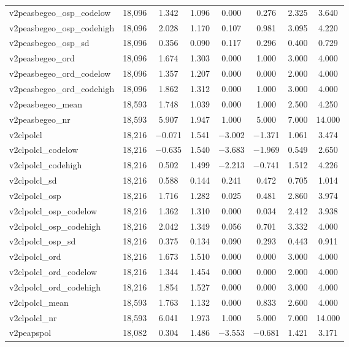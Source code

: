 \begin{table}[!htbp]
\begin{tabular}{@{\extracolsep{5pt}}lccccccc}
v2peasbegeo\_osp\_codelow & 18,096 & 1.342 & 1.096 & 0.000 & 0.276 & 2.325 & 3.640 \\ 
v2peasbegeo\_osp\_codehigh & 18,096 & 2.028 & 1.170 & 0.107 & 0.981 & 3.095 & 4.220 \\ 
v2peasbegeo\_osp\_sd & 18,096 & 0.356 & 0.090 & 0.117 & 0.296 & 0.400 & 0.729 \\ 
v2peasbegeo\_ord & 18,096 & 1.674 & 1.303 & 0.000 & 1.000 & 3.000 & 4.000 \\ 
v2peasbegeo\_ord\_codelow & 18,096 & 1.357 & 1.207 & 0.000 & 0.000 & 2.000 & 4.000 \\ 
v2peasbegeo\_ord\_codehigh & 18,096 & 1.862 & 1.312 & 0.000 & 1.000 & 3.000 & 4.000 \\ 
v2peasbegeo\_mean & 18,593 & 1.748 & 1.039 & 0.000 & 1.000 & 2.500 & 4.250 \\ 
v2peasbegeo\_nr & 18,593 & 5.907 & 1.947 & 1.000 & 5.000 & 7.000 & 14.000 \\ 
v2clpolcl & 18,216 & $-$0.071 & 1.541 & $-$3.002 & $-$1.371 & 1.061 & 3.474 \\ 
v2clpolcl\_codelow & 18,216 & $-$0.635 & 1.540 & $-$3.683 & $-$1.969 & 0.549 & 2.650 \\ 
v2clpolcl\_codehigh & 18,216 & 0.502 & 1.499 & $-$2.213 & $-$0.741 & 1.512 & 4.226 \\ 
v2clpolcl\_sd & 18,216 & 0.588 & 0.144 & 0.241 & 0.472 & 0.705 & 1.014 \\ 
v2clpolcl\_osp & 18,216 & 1.716 & 1.282 & 0.025 & 0.481 & 2.860 & 3.974 \\ 
v2clpolcl\_osp\_codelow & 18,216 & 1.362 & 1.310 & 0.000 & 0.034 & 2.412 & 3.938 \\ 
v2clpolcl\_osp\_codehigh & 18,216 & 2.042 & 1.349 & 0.056 & 0.701 & 3.332 & 4.000 \\ 
v2clpolcl\_osp\_sd & 18,216 & 0.375 & 0.134 & 0.090 & 0.293 & 0.443 & 0.911 \\ 
v2clpolcl\_ord & 18,216 & 1.673 & 1.510 & 0.000 & 0.000 & 3.000 & 4.000 \\ 
v2clpolcl\_ord\_codelow & 18,216 & 1.344 & 1.454 & 0.000 & 0.000 & 2.000 & 4.000 \\ 
v2clpolcl\_ord\_codehigh & 18,216 & 1.854 & 1.527 & 0.000 & 0.000 & 3.000 & 4.000 \\ 
v2clpolcl\_mean & 18,593 & 1.763 & 1.132 & 0.000 & 0.833 & 2.600 & 4.000 \\ 
v2clpolcl\_nr & 18,593 & 6.041 & 1.973 & 1.000 & 5.000 & 7.000 & 14.000 \\ 
v2peapspol & 18,082 & 0.304 & 1.486 & $-$3.553 & $-$0.681 & 1.421 & 3.171 \\ 

\end{tabular}
\end{table}
